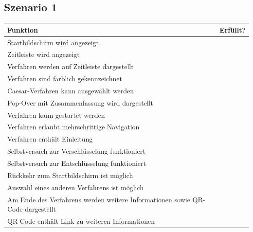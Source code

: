 \documentclass{article}
\newcommand{\cmark}{\ding{51}}
\begin{document}
  \subsection{Szenario 1}
    \begin{table}[H]
      \begin{tabularx}{\textwidth}{| >{\raggedright\arraybackslash}X | c |}
        \hline
        \textbf{Funktion} & \textbf{Erfüllt?} \\
        \hline
        Startbildschirm wird angezeigt & \cmark \\
        \hline
        Zeitleiste wird angezeigt & \cmark \\
        \hline
        Verfahren werden auf Zeitleiste dargestellt & \cmark \\
        \hline
        Verfahren sind farblich gekennzeichnet & \cmark \\
        \hline
        Caesar-Verfahren kann ausgewählt werden & \cmark \\
        \hline
        Pop-Over mit Zusammenfassung wird dargestellt & \cmark \\
        \hline
        Verfahren kann gestartet werden & \cmark \\
        \hline
        Verfahren erlaubt mehrschrittige Navigation & \cmark \\
        \hline
        Verfahren enthält Einleitung & \cmark \\
        \hline
        Selbstversuch zur Verschlüsselung funktioniert & \cmark \\
        \hline
        Selbstversuch zur Entschlüsselung funktioniert & \cmark \\
        \hline
        Rückkehr zum Startbildschirm ist möglich & \cmark \\
        \hline
        Auswahl eines anderen Verfahrens ist möglich & \cmark \\
        \hline
        Am Ende des Verfahrens werden weitere Informationen sowie QR-Code dargestellt & \cmark \\
        \hline
        QR-Code enthält Link zu weiteren Informationen & \cmark \\
        \hline
      \end{tabularx}
    \end{table}
\end{document}

